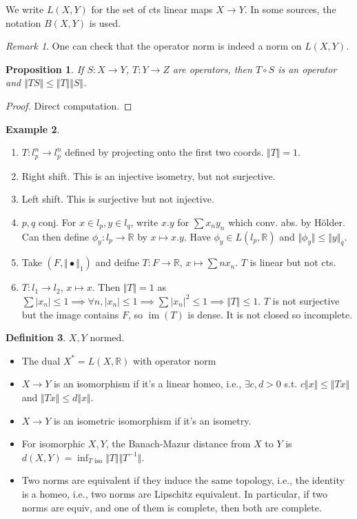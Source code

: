 \documentclass{article}
\theoremstyle{definition}
\newtheorem{defn}{Definition}[section]
\newtheorem{example}[defn]{Example}
\theoremstyle{remark}
\newtheorem{rem}{Remark}
\theoremstyle{plain}
\newtheorem{prop}[defn]{Proposition}
\newcommand{\RR}{\mathbb{R}}
\begin{document}
We write $L(X,Y)$ for the set of cts linear maps $X\to Y$. In some sources, the notation $B(X,Y)$ is used.
\begin{rem}
    One can check that the operator norm is indeed a norm on $L(X,Y)$.
\end{rem}
\begin{prop}
    If $S:X\to Y$, $T:Y\to Z$ are operators, then $T\circ S$ is an operator and $\Vert TS\Vert\le \Vert T\Vert\Vert S\Vert$.
\end{prop}
\begin{proof}
    Direct computation.
\end{proof}
\begin{example}
    \begin{enumerate}
        \item $T:l_p^n\to l_p^n$ defined by projecting onto the first two coords. $\Vert T\Vert=1$.
        \item Right shift. This is an injective isometry, but not surjective.
        \item Left shift. This is surjective but not injective.
        \item $p,q$ conj. For $x\in l_p, y\in l_q$, write $x.y$ for $\sum x_ny_n$ which conv. abs. by H\"older. Can then define $\phi_y:l_p\to \RR$ by $x\mapsto x.y$. Have $\phi_y\in L(l_p,\RR)$ and $\Vert\phi_y\Vert\le \Vert y\Vert_q$.
        \item Take $(F,\Vert\bullet\Vert_1)$ and deifne $T:F\to \RR$, $x\mapsto \sum nx_n$. $T$ is linear but not cts.
        \item $T:l_1\to l_2$, $x\mapsto x$. Then $\Vert T\Vert=1$ as $\sum |x_n|\le 1\implies \forall n, |x_n|\le 1\implies\sum|x_n|^2\le 1\implies \Vert T\Vert\le 1$. $T$ is not surjective but the image contains $F$, so $\operatorname{im}(T)$ is dense. It is not closed so incomplete.
    \end{enumerate}
\end{example}
\begin{defn}
    $X,Y$ normed.
    \begin{itemize}
        \item The dual $X^\ast=L(X,\RR)$ with operator norm
        \item $X\to Y$ is an isomorphism if it's a linear homeo, i.e., $\exists c,d>0$ s.t. $c\Vert x\Vert\le\Vert Tx\Vert$ and $\Vert Tx\Vert\le d\Vert x\Vert$.
        \item  $X\to Y$ is an isometric isomorphism if it's an isometry.
        \item For isomorphic $X,Y$, the Banach-Mazur distance from $X$ to $Y$ is $d(X,Y)=\inf_{T \text{ iso}}\Vert T\Vert\Vert T^{-1}\Vert$.
        \item Two norms are equivalent if they induce the same topology, i.e., the identity is a homeo, i.e., two norms are Lipschitz equivalent. In particular, if two norms are equiv, and one of them is complete, then both are complete.
    \end{itemize}
\end{defn}
\end{document}
